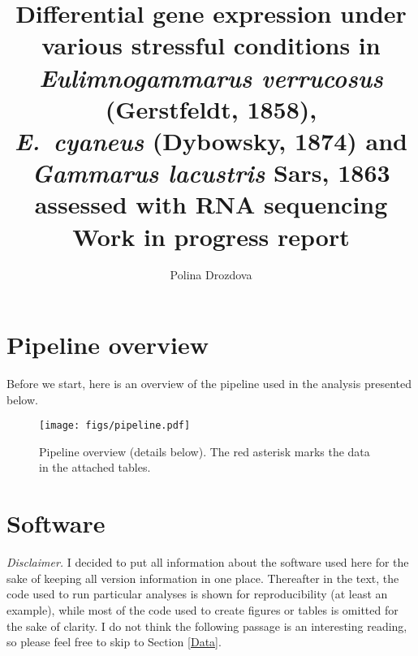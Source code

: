 \documentclass[12pt]{article}
\title{Differential gene expression under various stressful conditions in \textit{Eulimnogammarus verrucosus} (Gerstfeldt, 1858), \\ \textit{E.~cyaneus} (Dybowsky, 1874) and \textit{Gammarus lacustris}  Sars, 1863 assessed with RNA sequencing \\ \vskip 5mm \large
Work in progress report}
\author{Polina Drozdova}
\begin{document}
	\maketitle

	
%	
%	
\newpage

\tableofcontents

\newpage 

\section{Pipeline overview}

Before we start, here is an overview of the pipeline used in the analysis presented below. 

\begin{figure}[H]
\texttt{[image: figs/pipeline.pdf]}
\caption{Pipeline overview (details below). The red asterisk marks the data in the attached tables.} 
\label{pipeline}
\end{figure}


\section{Software}

\textit{Disclaimer.} I decided to put all information about the software used here for the sake of keeping all version information in one place. Thereafter in the text, the code used to run particular analyses is shown for reproducibility (at least an example), while most of the code used to create figures or tables is omitted for the sake of clarity. 
I do not think the following passage is an interesting reading, so please feel free to skip to Section \ref{Data}.
\medskip
	
\end{document}
